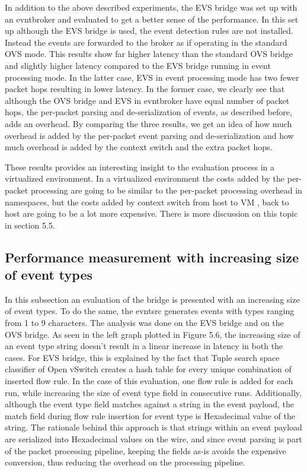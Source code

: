 In addition to the above described experiments, the EVS bridge was set up with an evntbroker and evaluated to get a better sense of the performance. In this set up although the EVS bridge is used, the event detection rules are not installed. Instead the events are forwarded to the broker as if operating in the standard OVS mode. This results show far higher latency than the standard OVS bridge and slightly higher latency compared to the EVS bridge running in event processing mode. In the latter case, EVS in event processing mode has two fewer packet hops resulting in lower latency. In the former case, we clearly see that although the OVS bridge and EVS in evntbroker have equal number of packet hops, the per-packet parsing and de-serialization of events, as described before, adds an overhead. By comparing the three results, we get an idea of how much overhead is added by the per-packet event parsing and de-serialization and how much overhead is added by the context switch and the extra packet hops. 

These results provides an interesting insight to the evaluation process in a virtualized environment. In a virtualized environment the costs added by the per-packet processing are going to be similar to the per-packet processing overhead in namespaces, but the costs added by context switch from host to VM , back to host are going to be a lot more expensive. There is more discussion on this topic in section 5.5.

\subsection{Performance measurement with increasing size of event types}
In this subsection an evaluation of the bridge is presented with an increasing size of event types. To do the same, the evntsrc generates events with types ranging from 1 to 9 characters. The analysis was done on the EVS bridge and on the OVS bridge. As seen in the left graph plotted in Figure 5.6, the increasing size of an event type string doesn't result in a linear increase in latency in both the cases. For EVS bridge, this is explained by the fact that Tuple search space classifier of Open vSwitch creates a hash table for every unique combination of inserted flow rule. In the case of this evaluation, one flow rule is added for each run, while increasing the size of event type field in consecutive runs. Additionally, although the event type field matches against a string in the event payload, the match field during flow rule insertion for event type is Hexadecimal value of the string. The rationale behind this approach is that strings within an event payload are serialized into Hexadecimal values on the wire, and since event parsing is part of the packet processing pipeline, keeping the fields as-is avoids the expensive conversion, thus reducing the overhead on the processing pipeline. 

